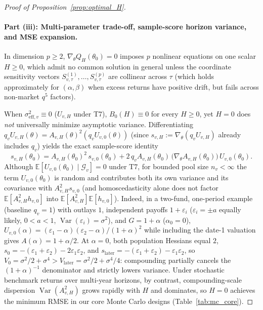 \begin{proof}[Proof of Proposition~\ref{prop:optimal_H}]
\paragraph{Part (iii): Multi-parameter trade-off, sample-score horizon variance, and MSE expansion.}
In dimension $p \ge 2$, $\nabla_\theta Q_H(\theta_0) = 0$ imposes $p$ nonlinear equations on one scalar $H \ge 0$, which admit no common solution in general unless the coordinate sensitivity vectors $S_{v,\tau}^{(1)}, \dots, S_{v,\tau}^{(p)}$ are collinear across $\tau$ (which holds approximately for $(\alpha,\beta)$ when excess returns have positive drift, but fails across non-market $q^5$ factors).

When $\sigma_{\mathrm{eff},v}^2 \equiv 0$ ($U_{v,H}$ under T7), $B_0(H) \equiv 0$ for every $H \ge 0$, yet $H=0$ does \emph{not} universally minimize asymptotic variance. Differentiating $q_v U_{v,H}(\theta) = A_{v,H}(\theta)^2 (q_v U_{v,0}(\theta))$ (since $s_{v,H} := \nabla_\theta(q_v U_{v,H})$ already includes $q_v$) yields the exact sample-score identity
\begin{equation}
\label{eq:app_score_H_identity}
s_{v,H}(\theta_0)
= A_{v,H}(\theta_0)^2\,s_{v,0}(\theta_0) + 2\,q_v A_{v,H}(\theta_0)\,\bigl(\nabla_\theta A_{v,H}(\theta_0)\bigr)\,U_{v,0}(\theta_0).
\end{equation}
Although $\mathbb{E}[U_{v,0}(\theta_0)\mid\mathcal{G}_v] = 0$ under T7, for bounded pool size $n_v < \infty$ the term $U_{v,0}(\theta_0)$ is random and contributes both its own variance and its covariance with $A_{v,H}^2 s_{v,0}$ (and homoscedasticity alone does not factor $\mathbb{E}[A_{v,H}^2 h_{v,0}]$ into $\mathbb{E}[A_{v,H}^2]\mathbb{E}[h_{v,0}]$). Indeed, in a two-fund, one-period example (baseline $q_v = 1$) with outlays $1$, independent payoffs $1+\varepsilon_i$ ($\varepsilon_i = \pm a$ equally likely, $0<a<1$, $\operatorname{Var}(\varepsilon_i)=\sigma^2$), and $G = 1+\alpha$ ($\alpha_0=0$), $U_{v,0}(\alpha) = (\varepsilon_1-\alpha)(\varepsilon_2-\alpha)/(1+\alpha)^2$ while including the date-1 valuation gives $A(\alpha) = 1+\alpha/2$. At $\alpha=0$, both population Hessians equal $2$, $s_0 = -(\varepsilon_1+\varepsilon_2) - 2\varepsilon_1\varepsilon_2$, and $s_{\mathrm{later}} = -(\varepsilon_1+\varepsilon_2) - \varepsilon_1\varepsilon_2$, so $V_0 = \sigma^2/2 + \sigma^4 > V_{\mathrm{later}} = \sigma^2/2 + \sigma^4/4$: compounding partially cancels the $(1+\alpha)^{-1}$ denominator and strictly lowers variance. Under stochastic benchmark returns over multi-year horizons, by contrast, compounding-scale dispersion $\operatorname{Var}(A_{v,H}^2)$ grows rapidly with $H$ and dominates, so $H=0$ achieves the minimum RMSE in our core Monte Carlo designs (Table~\ref{tab:mc_core}).


\end{proof}
